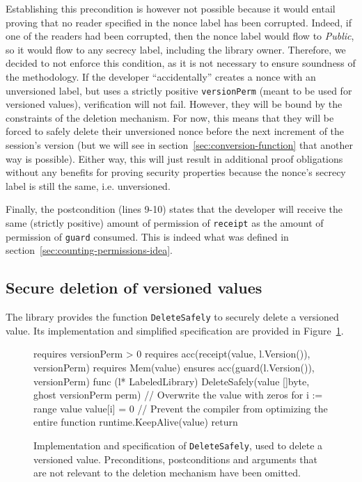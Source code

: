 Establishing this precondition is however not possible because it would entail proving that no reader specified in the nonce label has been corrupted. Indeed, if one of the readers had been corrupted, then the nonce label would flow to \emph{Public}, so it would flow to any secrecy label, including the library owner.
Therefore, we decided to not enforce this condition, as it is not necessary to ensure soundness of the methodology.
If the developer “accidentally” creates a nonce with an unversioned label, but uses a strictly positive \texttt{versionPerm} (meant to be used for versioned values), verification will not fail.
However, they will be bound by the constraints of the deletion mechanism. For now, this means that they will be forced to safely delete their unversioned nonce before the next increment of the session's version (but we will see in section~\ref{sec:conversion-function} that another way is possible).
Either way, this will just result in additional proof obligations without any benefits for proving security properties because the nonce's secrecy label is still the same, i.e. unversioned.

Finally, the postcondition (lines 9-10) states that the developer will receive the same (strictly positive) amount of permission of \texttt{receipt} as the amount of permission of \texttt{guard} consumed. This is indeed what was defined in section~\ref{sec:counting-permissions-idea}.

\subsection{Secure deletion of versioned values}
\label{sec:secure-deletion-of-versioned-values}

The library provides the function \texttt{DeleteSafely} to securely delete a versioned value. Its implementation and simplified specification are provided in Figure~\ref{lst:delete-safely}.

\begin{figure}
    \begin{gobra}
requires versionPerm > 0
requires acc(receipt(value, l.Version()), versionPerm)
requires Mem(value)
ensures  acc(guard(l.Version()), versionPerm)
func (l* LabeledLibrary) DeleteSafely(value []byte,
    ghost versionPerm perm) {
    // Overwrite the value with zeros
    for i := range value {
        value[i] = 0
    }
    // Prevent the compiler from optimizing the entire function
    runtime.KeepAlive(value)
    return
}
    \end{gobra}
    \caption{Implementation and specification of \texttt{DeleteSafely}, used to delete a versioned value. Preconditions, postconditions and arguments that are not relevant to the deletion mechanism have been omitted.}
    \label{lst:delete-safely}
\end{figure}

